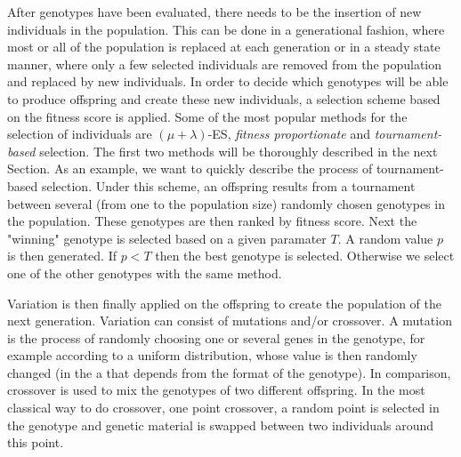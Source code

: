 
    After genotypes have been evaluated, there needs to be the insertion of new individuals in the population. This can be done in a generational fashion, where most or all of the population is replaced at each generation or in a steady state manner, where only a few selected individuals are removed from the population and replaced by new individuals. In order to decide which genotypes will be able to produce offspring and create these new individuals, a selection scheme based on the fitness score is applied. Some of the most popular methods for the selection of individuals are \((\mu + \lambda)\)-ES, \emph{fitness proportionate} and \emph{tournament-based} selection. The first two methods will be thoroughly described in the next Section. As an example, we want to quickly describe the process of tournament-based selection. Under this scheme, an offspring results from a tournament between several (from one to the population size) randomly chosen genotypes in the population. These genotypes are then ranked by fitness score. Next the "winning" genotype is selected based on a given paramater $T$. A random value $p$ is then generated. If \(p < T\) then the best genotype is selected. Otherwise we select one of the other genotypes with the same method.

    Variation is then finally applied on the offspring to create the population of the next generation. Variation can consist of mutations and/or crossover. A mutation is the process of randomly choosing one or several genes in the genotype, for example according to a uniform distribution, whose value is then randomly changed (in the a that depends from the format of the genotype). In comparison, crossover is used to mix the genotypes of two different offspring. In the most classical way to do crossover, one point crossover, a random point is selected in the genotype and genetic material is swapped between two individuals around this point. 

